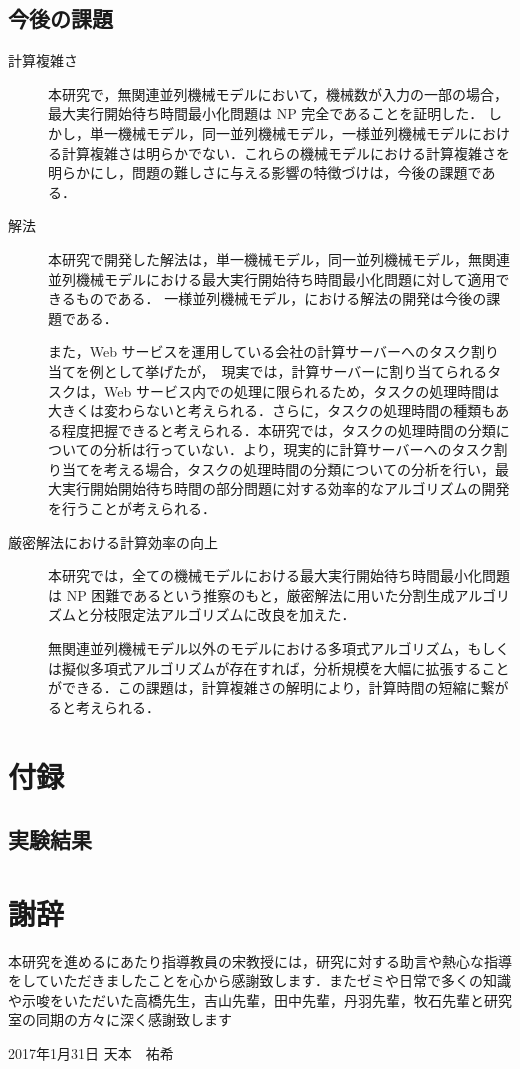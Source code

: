 \documentclass[12pt]{optlab-bachelor}
\def\氏名{天本　祐希}
\begin{document}
\section{今後の課題}
\begin{description}
  \item[計算複雑さ ] 本研究で，無関連並列機械モデルにおいて，機械数が入力の一部の場合，最大実行開始待ち時間最小化問題は NP 完全であることを証明した．
  しかし，単一機械モデル，同一並列機械モデル，一様並列機械モデルにおける計算複雑さは明らかでない．これらの機械モデルにおける計算複雑さを明らかにし，問題の難しさに与える影響の特徴づけは，今後の課題である．

  \item[解法 ] 本研究で開発した解法は，単一機械モデル，同一並列機械モデル，無関連並列機械モデルにおける最大実行開始待ち時間最小化問題に対して適用できるものである．
  一様並列機械モデル，における解法の開発は今後の課題である．

  また，Web サービスを運用している会社の計算サーバーへのタスク割り当てを例として挙げたが，　現実では，計算サーバーに割り当てられるタスクは，Web サービス内での処理に限られるため，タスクの処理時間は大きくは変わらないと考えられる．さらに，タスクの処理時間の種類もある程度把握できると考えられる．本研究では，タスクの処理時間の分類についての分析は行っていない．より，現実的に計算サーバーへのタスク割り当てを考える場合，タスクの処理時間の分類についての分析を行い，最大実行開始開始待ち時間の部分問題に対する効率的なアルゴリズムの開発を行うことが考えられる．

  \item[厳密解法における計算効率の向上 ] 本研究では，全ての機械モデルにおける最大実行開始待ち時間最小化問題は NP 困難であるという推察のもと，厳密解法に用いた分割生成アルゴリズムと分枝限定法アルゴリズムに改良を加えた．

  無関連並列機械モデル以外のモデルにおける多項式アルゴリズム，もしくは擬似多項式アルゴリズムが存在すれば，分析規模を大幅に拡張することができる．この課題は，計算複雑さの解明により，計算時間の短縮に繋がると考えられる．
\end{description}

\chapter{付録}\label{c_7}
\section{実験結果}






\chapter*{謝辞}
本研究を進めるにあたり指導教員の宋教授には，研究に対する助言や熱心な指導をしていただきましたことを心から感謝致します．またゼミや日常で多くの知識や示唆をいただいた高橋先生，吉山先輩，田中先輩，丹羽先輩，牧石先輩と研究室の同期の方々に深く感謝致します

\begin{flushright}
  2017年1月31日 \氏名
\end{flushright}
\endmatter
\end{document}
